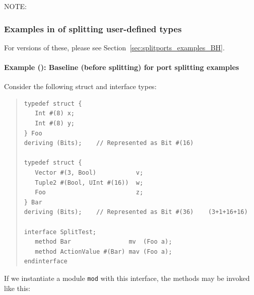 NOTE: \hfill {}


\subsubsection{Examples in {\BSVb} of splitting user-defined types}


\label{sec:splitports_examples_BSV}

{\footnotesize
For {\BHb} versions of these, please see Section~\ref{sec:splitports_examples_BH}.}


\paragraph{Example ({\BSVb}): Baseline (before splitting) for port splitting examples}

\label{sec:splitports_examples_BSV_baseline}

\hspace*{1em}

Consider the following struct and interface types:
\begin{quote}
\begin{verbatim}
typedef struct {
   Int #(8) x;
   Int #(8) y;
} Foo
deriving (Bits);    // Represented as Bit #(16)

typedef struct {
   Vector #(3, Bool)           v;
   Tuple2 #(Bool, UInt #(16))  w;
   Foo                         z;
} Bar
deriving (Bits);    // Represented as Bit #(36)    (3+1+16+16)

interface SplitTest;
   method Bar                mv  (Foo a);
   method ActionValue #(Bar) mav (Foo a);
endinterface
\end{verbatim}
\end{quote}

If we instantiate a module {\tt mod} with this interface, the methods
may be invoked like this:

